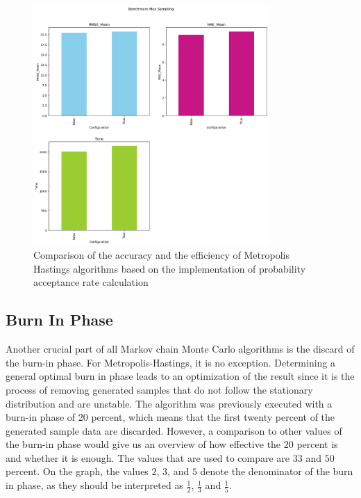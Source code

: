 \begin{figure}
    \centering
    \includegraphics[width=0.8\textwidth]{figures/basic_mh/benchmark/max_sampling.png}
    \captionsetup{width=.8\textwidth}
    \caption{Comparison of the accuracy and the efficiency of Metropolis Hastings algorithms based on the implementation of probability acceptance rate calculation}
    \label{fig:enter-label}
\end{figure}



\subsection{Burn In Phase}
Another crucial part of all Markov chain Monte Carlo algorithms is the discard of the burn-in phase. For Metropolis-Hastings, it is no exception. Determining a general optimal burn in phase leads to an optimization of the result since it is the process of removing generated samples that do not follow the stationary distribution and are unstable. The algorithm was previously executed with a burn-in phase of 20 percent, which means that the first twenty percent of the generated sample data are discarded. However, a comparison to other values of the burn-in phase would give us an overview of how effective the 20 percent is and whether it is enough. The values that are used to compare are $33$ and $50$ percent. On the graph, the values $2$, $3$, and $5$ denote the denominator of the burn in phase, as they should be interpreted as $\frac 1 2$, $\frac 1 3$ and $\frac 1 5$.

